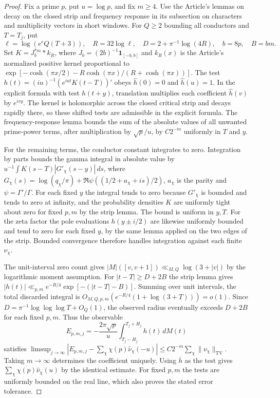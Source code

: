 \documentclass[11pt]{article}
\begin{document}
\begin{proof} Fix a prime $p$, put $u=\log p$, and fix $m\ge4$.
Use the Article's lemmas on decay on the closed strip and frequency response
in its subsection on characters and multiplicity vectors in short windows.
For $Q\ge2$ bounding all conductors and $T=T_j$, put
\[
 \ell=\log(e^eQ(T+3)),\quad R=32\log\ell,\quad
 D=2+\pi^{-1}\log(4R),\quad b=8p,\quad B=bm.
\]
Set $K=J_b^{*m}*k_R$, where $J_b=(2b)^{-1}\mathbf{1}_{[-b,b]}$ and
$k_R(x)$ is the Article's normalized positive kernel proportional to
$\exp[-\cosh(\pi x/2)-R\cosh(\pi x)/(R+\cosh(\pi x))]$.
The test $h(t)=(iu)^{-1}(e^{iut}K(t-T))'$ obeys
$\widehat h(0)=0$ and $\widehat h(u)=1$.
In the explicit formula with test $h(t+y)$, translation multiplies each coefficient
$\widehat h(v)$ by $e^{ivy}$. The kernel is holomorphic across the closed critical strip and decays rapidly there, so these shifted tests are admissible in the explicit formula. The frequency-response lemma bounds the sum
of the absolute values of all unwanted prime-power terms, after multiplication
by $\sqrt p/u$, by $C2^{-m}$ uniformly in $T$ and $y$.

For the remaining terms, the conductor constant integrates to zero.
Integration by parts bounds the gamma integral in absolute value by
$u^{-1}\int K(s-T)|G'_\chi(s-y)|\,ds$, where
$G_\chi(s)=\log(q_\chi/\pi)+\Re\psi((1/2+a_\chi+is)/2)$,
$a_\chi$ is the parity and $\psi=\Gamma'/\Gamma$.
For each fixed $y$ the integral tends to zero because $G'_\chi$ is bounded and tends to
zero at infinity, and the probability densities $K$ are uniformly tight
about zero for fixed $p,m$ by the strip lemma.
The bound is uniform in $y,T$. For the zeta factor the pole evaluations
$h(y\pm i/2)$ are likewise uniformly bounded and tend to zero for each fixed $y$,
by the same lemma applied on the two edges of the strip.
Bounded convergence therefore handles integration against each finite $\nu_\chi$.

The unit-interval zero count gives
$|M|([v,v+1])\ll_{M,Q}\log(3+|v|)$ by the logarithmic moment assumption.
For $|t-T|\ge D+2B$ the strip lemma gives
$|h(t)|\ll_{p,m} e^{-R/4}\exp[-(|t-T|-B)]$.
Summing over unit intervals, the total discarded integral is
$O_{M,Q,p,m}(e^{-R/4}(1+\log(3+T)))=o(1)$.
Since $D=\pi^{-1}\log\log\log T+O_Q(1)$, the observed radius eventually
exceeds $D+2B$ for each fixed $p,m$. Thus the observable
\[
 E_{p,m,j}=-\frac{2\pi\sqrt p}{u}
       \int_{T_j-H_j}^{T_j+H_j}h(t)\,dM(t)
\]
satisfies
$\limsup_{j\to\infty}|E_{p,m,j}-\sum_\chi\chi(p)\widehat\nu_\chi(-u)|
\le C2^{-m}\sum_\chi\|\nu_\chi\|_{\mathrm{TV}}$.
Taking $m\to\infty$ determines the coefficient uniquely.
Using $\overline h$ as the test gives
$\sum_\chi\overline{\chi(p)}\widehat\nu_\chi(u)$ by the identical estimate.
For fixed $p,m$ the tests are uniformly bounded on the real line, which
also proves the stated error tolerance.\end{proof}
\end{document}
